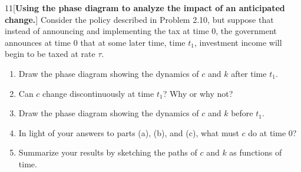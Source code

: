 \begin{problem}{11}[\textbf{Using the phase diagram to analyze the impact of an anticipated change.}]
Consider the policy described in Problem 2.10, but suppose that instead of announcing and implementing the tax at time 0, the government announces at time 0 that at some later time, time \(t_1\), investment income will begin to be taxed at rate \(\tau\).
\begin{enumerate}[label=(\alph*)]
    \item Draw the phase diagram showing the dynamics of \(c\) and \(k\) after time \(t_1\).
    \item Can \(c\) change discontinuously at time \(t_1\)? Why or why not?
    \item Draw the phase diagram showing the dynamics of \(c\) and \(k\) before \(t_1\).
    \item In light of your answers to parts (a), (b), and (c), what must \(c\) do at time 0?
    \item Summarize your results by sketching the paths of \(c\) and \(k\) as functions of time.
\end{enumerate}
\end{problem}

